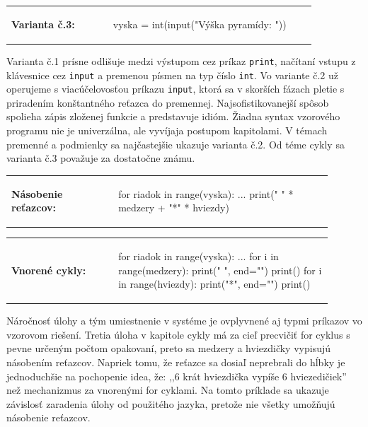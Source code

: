 \vspace{-2em}
\begin{tabular}{@{}p{0.3\linewidth}p{0.6\linewidth}}
\textbf{\small Varianta č.3:} &
\vspace{-1em}
\begin{solution}
vyska = int(input("Výška pyramídy: "))
\end{solution}
\end{tabular}

Varianta č.1 prísne odlišuje medzi výstupom cez príkaz \verb|print|, načítaní vstupu z klávesnice cez \verb|input| a premenou písmen na typ číslo \verb|int|. Vo variante č.2 už operujeme s viacúčelovosťou príkazu \verb|input|, ktorá sa v skorších fázach pletie s priradením konštantného reťazca do premennej. Najsofistikovanejší spôsob spolieha zápis zloženej funkcie a predstavuje idióm. Žiadna syntax vzorového programu nie je univerzálna, ale vyvíjaja postupom kapitolami. V témach premenné a podmienky sa najčastejšie ukazuje varianta č.2. Od téme cykly sa varianta č.3 považuje za dostatočne známu.

\begin{tabular}{@{}p{0.3\linewidth}p{0.6\linewidth}}
\textbf{\small Násobenie reťazcov:} &
\vspace{-1em}
\begin{solution}
for riadok in range(vyska):
	...
	print(" " * medzery + "*" * hviezdy)
\end{solution}
\end{tabular}

\vspace{-2em}
\begin{tabular}{@{}p{0.3\linewidth}p{0.6\linewidth}}
\textbf{\small Vnorené cykly:} &
\vspace{-1em}
\begin{solution}
for riadok in range(vyska):
	...
	for i in range(medzery):
		print(" ", end="")
	print()
	for i in range(hviezdy):
		print("*", end="")
	print()
\end{solution}
\end{tabular}

Náročnosť úlohy a tým umiestnenie v systéme je ovplyvnené aj typmi príkazov vo vzorovom riešení. Tretia úloha v kapitole cykly má za cieľ precvičiť for cyklus s pevne určeným počtom opakovaní, preto sa medzery a hviezdičky vypisujú násobením reťazcov. Napriek tomu, že reťazce sa dosiaľ neprebrali do hĺbky je jednoduchšie na pochopenie idea, že: ,,6 krát hviezdička vypíše 6 hviezedičiek'' než mechanizmus za vnorenými for cyklami. Na tomto príklade sa ukazuje závislosť zaradenia úlohy od použitého jazyka, pretože nie všetky umožňujú násobenie reťazcov.

